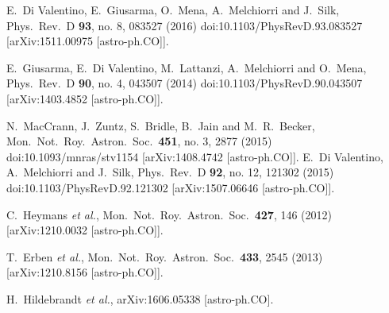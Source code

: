 \documentclass[aps,prd,a4paper,twocolumn,amsmath,showpacs,superscriptaddress,nofootinbib,preprintnumbers]{revtex4-1}
\begin{document}
\begin{thebibliography}{99}
  E.~Di Valentino, E.~Giusarma, O.~Mena, A.~Melchiorri and J.~Silk,
  Phys.\ Rev.\ D {\bf 93}, no. 8, 083527 (2016)
  doi:10.1103/PhysRevD.93.083527
  [arXiv:1511.00975 [astro-ph.CO]].
  

E.~Giusarma, E.~Di Valentino, M.~Lattanzi, A.~Melchiorri and O.~Mena,
  Phys.\ Rev.\ D {\bf 90}, no. 4, 043507 (2014)
  doi:10.1103/PhysRevD.90.043507
  [arXiv:1403.4852 [astro-ph.CO]].
  
  N.~MacCrann, J.~Zuntz, S.~Bridle, B.~Jain and M.~R.~Becker,
  Mon.\ Not.\ Roy.\ Astron.\ Soc.\  {\bf 451}, no. 3, 2877 (2015)
  doi:10.1093/mnras/stv1154
  [arXiv:1408.4742 [astro-ph.CO]].
  E.~Di Valentino, A.~Melchiorri and J.~Silk,
  Phys.\ Rev.\ D {\bf 92}, no. 12, 121302 (2015)
  doi:10.1103/PhysRevD.92.121302
  [arXiv:1507.06646 [astro-ph.CO]].
 
  C.~Heymans {\it et al.},
  Mon.\ Not.\ Roy.\ Astron.\ Soc.\  {\bf 427}, 146 (2012)
  [arXiv:1210.0032 [astro-ph.CO]].
  
  T.~Erben {\it et al.},
  Mon.\ Not.\ Roy.\ Astron.\ Soc.\  {\bf 433}, 2545 (2013)
  [arXiv:1210.8156 [astro-ph.CO]].

  H.~Hildebrandt {\it et al.},
  arXiv:1606.05338 [astro-ph.CO].
 

\end{thebibliography}
\end{document}
